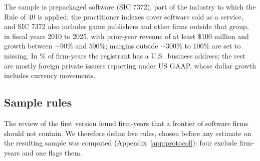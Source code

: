 The sample is prepackaged software (SIC 7372), part of the industry to which the Rule of 40 is applied; the practitioner indexes cover software sold as a service, and SIC 7372 also includes game publishers and other firms outside that group, in fiscal years 2010 to 2025, with prior-year revenue of at least \$100 million and growth between $-90\%$ and $500\%$; margins outside $-300\%$ to $100\%$ are set to missing. In \VUsShare\% of firm-years the registrant has a U.S.\ business address; the rest are mostly foreign private issuers reporting under US GAAP, whose dollar growth includes currency movements.

\subsection{Sample rules}\label{sec:data-rules}
The review of the first version found firm-years that a frontier of software firms should not contain. We therefore define five rules, chosen before any estimate on the resulting sample was computed (Appendix~\ref{app:protocol}): four exclude firm-years and one flags them.

